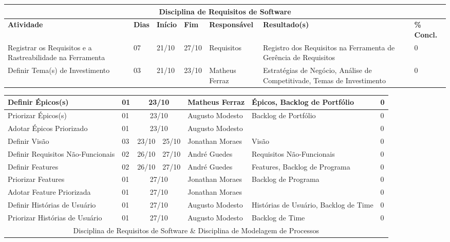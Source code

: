 \begin{landscape}
\begin{center}
\begin{tabular}{|m{6cm}|m{1cm}|m{1cm}|m{1cm}|m{4cm}|m{6cm}|m{2cm}|}
			\multicolumn{7}{|c|}{Disciplina de Requisitos de Software} \\
			\hline
			\textbf{Atividade} & \textbf{Dias} & \textbf{Início} & \textbf{Fim} & \textbf{Responsável} & \textbf{Resultado(s)} & \textbf{\% Concl.} \\ \hline
			Registrar os Requisitos e a Rastreabilidade na Ferramenta & 07 & 21/10 & 27/10 & Requisitos & Registro dos Requisitos na Ferramenta de Gerência de Requisitos & 0 \\ \hline
			Definir Tema(s) de Investimento & 03 & 21/10 & 23/10 & Matheus Ferraz & Estratégias de Negócio, Análise de Competitivade, Temas de Investimento & 0 \\ \hline
			\end{tabular}
		\end{center}
		\begin{center}
			\begin{tabular}{|m{6cm}|m{1cm}|m{1cm}|m{1cm}|m{4cm}|m{6cm}|m{2cm}|}
			\hline
			Definir Épicos(s) & 01 & \multicolumn{2}{c|}{23/10} & Matheus Ferraz & Épicos, Backlog de Portfólio & 0 \\ \hline
			Priorizar Épicos(s) & 01 & \multicolumn{2}{c|}{23/10} & Augusto Modesto & Backlog de Portfólio & 0 \\ \hline
			Adotar Épicos Priorizado & 01 & \multicolumn{2}{c|}{23/10} & Augusto Modesto & & 0 \\ \hline
			Definir Visão & 03 & 23/10 & 25/10 & Jonathan Moraes & Visão & 0 \\ \hline
			Definir Requisitos Não-Funcionais & 02 & 26/10 & 27/10 & André Guedes & Requisitos Não-Funcionais & 0 \\ \hline
			Definir Features & 02 & 26/10 & 27/10 & André Guedes & Features, Backlog de Programa & 0 \\ \hline
			Priorizar Features & 01 & \multicolumn{2}{c|}{27/10} & Jonathan Moraes & Backlog de Programa & 0 \\ \hline
			Adotar Feature Priorizada & 01 & \multicolumn{2}{c|}{27/10} & Jonathan Moraes & & 0 \\ \hline
			Definir Histórias de Usuário & 01 & \multicolumn{2}{c|}{27/10} & Augusto Modesto & Histórias de Usuário, Backlog de Time & 0 \\ \hline
			Priorizar Histórias de Usuário & 01 & \multicolumn{2}{c|}{27/10} & Augusto Modesto & Backlog de Time & 0 \\ \hline
			\multicolumn{7}{|c|}{Disciplina de Requisitos de Software \& Disciplina de Modelagem de Processos} \\ \hline

\end{tabular}
\end{center}
\end{landscape}
